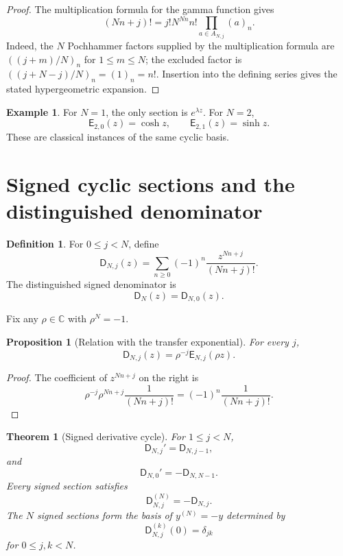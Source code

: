 \documentclass[11pt]{article}
\newtheorem{theorem}{Theorem}[section]
\newtheorem{proposition}[proposition]{Proposition}
\theoremstyle{definition}
\newtheorem{definition}[definition]{Definition}
\newtheorem{example}[example]{Example}
\theoremstyle{remark}
\newcommand{\CC}{\mathbb C}
\newcommand{\Dfun}{\mathsf D}
\newcommand{\Efun}{\mathsf E}
\begin{document}
\begin{proof}
The multiplication formula for the gamma function gives
\[
(Nn+j)!
=
j!N^{Nn}n!
\prod_{a\in A_{N,j}}(a)_n.
\]
Indeed, the $N$ Pochhammer factors supplied by the multiplication formula
are $((j+m)/N)_n$ for $1\leq m\leq N$; the excluded factor is
$((j+N-j)/N)_n=(1)_n=n!$.
Insertion into the defining series gives the stated hypergeometric expansion.
\end{proof}

\begin{example}\label{ex:classical_exponential}
For $N=1$, the only section is $e^{\lambda z}$.  For $N=2$,
\[
\Efun_{2,0}(z)=\cosh z,
\qquad
\Efun_{2,1}(z)=\sinh z.
\]
These are classical instances of the same cyclic basis.
\end{example}

\section{Signed cyclic sections and the distinguished denominator}\label{sec:signed_system}

\begin{definition}\label{def:signed_sections}
For $0\leq j<N$, define
\[
\Dfun_{N,j}(z)
=
\sum_{n\geq0}(-1)^n\frac{z^{Nn+j}}{(Nn+j)!}.
\]
The distinguished signed denominator is
\[
\Dfun_N(z)=\Dfun_{N,0}(z).
\]
\end{definition}

Fix any $\rho\in\CC$ with $\rho^N=-1$.

\begin{proposition}[Relation with the transfer exponential]\label{prop:signed_exponential_relation}
For every $j$,
\[
\Dfun_{N,j}(z)
=
\rho^{-j}\Efun_{N,j}(\rho z).
\]
\end{proposition}

\begin{proof}
The coefficient of $z^{Nn+j}$ on the right is
\[
\rho^{-j}\rho^{Nn+j}\frac1{(Nn+j)!}
=
(-1)^n\frac1{(Nn+j)!}.
\]
\end{proof}

\begin{theorem}[Signed derivative cycle]\label{thm:signed_cycle}
For $1\leq j<N$,
\[
\Dfun_{N,j}'=\Dfun_{N,j-1},
\]
and
\[
\Dfun_{N,0}'=-\Dfun_{N,N-1}.
\]
Every signed section satisfies
\[
\Dfun_{N,j}^{(N)}=-\Dfun_{N,j}.
\]
The $N$ signed sections form the basis of $y^{(N)}=-y$ determined by
\[
\Dfun_{N,j}^{(k)}(0)=\delta_{jk}
\]
for $0\leq j,k<N$.
\end{theorem}
\end{document}
